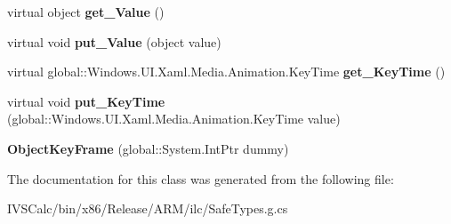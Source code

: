 \begin{DoxyCompactItemize}
virtual object {\bfseries get\+\_\+\+Value} ()
\item 
\mbox{\label{class_windows_1_1_u_i_1_1_xaml_1_1_media_1_1_animation_1_1_object_key_frame_a7a88c4df7997178c63cfd7b1d90e0db7}} 
virtual void {\bfseries put\+\_\+\+Value} (object value)
\item 
\mbox{\label{class_windows_1_1_u_i_1_1_xaml_1_1_media_1_1_animation_1_1_object_key_frame_a6ae8fd2feca5365340534cb345435679}} 
virtual global\+::\+Windows.\+U\+I.\+Xaml.\+Media.\+Animation.\+Key\+Time {\bfseries get\+\_\+\+Key\+Time} ()
\item 
\mbox{\label{class_windows_1_1_u_i_1_1_xaml_1_1_media_1_1_animation_1_1_object_key_frame_a3d3dee8a9ef100ac928ef177d7c8ec55}} 
virtual void {\bfseries put\+\_\+\+Key\+Time} (global\+::\+Windows.\+U\+I.\+Xaml.\+Media.\+Animation.\+Key\+Time value)
\item 
\mbox{\label{class_windows_1_1_u_i_1_1_xaml_1_1_media_1_1_animation_1_1_object_key_frame_ac48b6f8a34c2efefb0da6485e4eea19e}} 
{\bfseries Object\+Key\+Frame} (global\+::\+System.\+Int\+Ptr dummy)
\end{DoxyCompactItemize}


The documentation for this class was generated from the following file\+:\begin{DoxyCompactItemize}
\item 
I\+V\+S\+Calc/bin/x86/\+Release/\+A\+R\+M/ilc/Safe\+Types.\+g.\+cs\end{DoxyCompactItemize}
